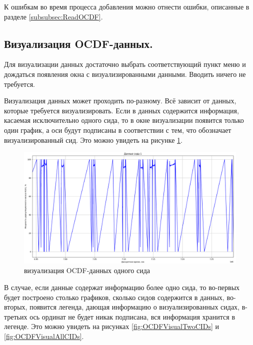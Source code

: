{  \par К ошибкам во время процесса добавления можно отнести ошибки, описанные в разделе \ref{subsubsec:ReadOCDF}.

  \par 
}

\subsection{ \standartTitleFont
  Визуализация OCDF-данных.
} \label{subsubsec:OCDFVisual}

{\standartFont

  \par Для визуализации данных достаточно выбрать соответствующий пункт меню и дождаться появления окна с визуализированными данными. Вводить ничего не требуется. 

  \par Визуализация данных может проходить по-разному. Всё зависит от данных, которые требуется визуализировать. Если в данных содержится информация, касаемая исключительно одного сида, то в окне визуализации появится только один график, а оси будут подписаны в соответствии с тем, что обозначает визуализированный сид. Это можно увидеть на рисунке \ref{fig:OCDFVisualOneCID}.

  \begin{figure}[H]
    \centering
    \includegraphics[width=\textwidth]{images/forDataManipulator/OCDFVisualOneCID.png}
    \caption{визуализация OCDF-данных одного сида} 
    \label{fig:OCDFVisualOneCID}
  \end{figure}

  \par В случае, если данные содержат информацию более одно сида, то во-первых будет построено столько графиков, сколько сидов содержится в данных, во-вторых, появится легенда, дающая информацию о визуализированных сидах, в-третьих ось ординат не будет никак подписана, вся информация хранится в легенде. Это можно увидеть на рисунках \ref{fig:OCDFVisualTwoCIDs} и \ref{fig:OCDFVisualAllCIDs}.

}
